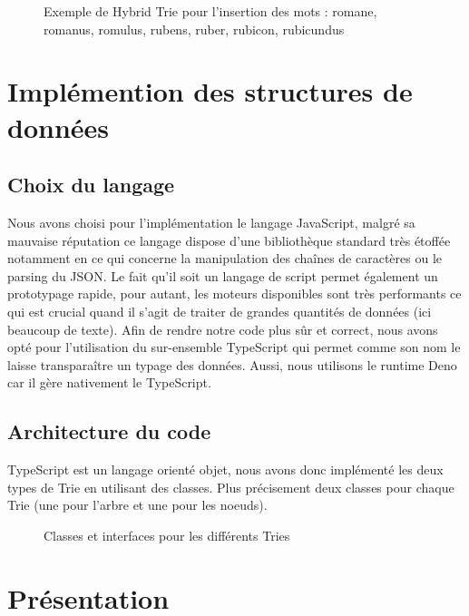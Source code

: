 \documentclass[11pt]{rapport-algav}
\begin{document}
\begin{figure}[ht!]
			\centering
			\caption{Exemple de Hybrid Trie pour l'insertion des mots : romane, romanus, romulus, rubens, ruber, rubicon, rubicundus}
			\label{fig:Hybrid_trie}
\end{figure}

\newpage

\chapter{Implémention des structures de données}

\section{Choix du langage}

Nous avons choisi pour l'implémentation le langage JavaScript, malgré sa mauvaise réputation ce langage dispose d'une bibliothèque standard très étoffée notamment en ce qui concerne la manipulation des chaînes de caractères ou le parsing du JSON. Le fait qu'il soit un langage de script permet également un prototypage rapide, pour autant, les moteurs disponibles sont très performants ce qui est crucial quand il s'agit de traiter de grandes quantités de données (ici beaucoup de texte). Afin de rendre notre code plus sûr et correct, nous avons opté pour l'utilisation du sur-ensemble TypeScript qui permet comme son nom le laisse transparaître un typage des données. Aussi, nous utilisons le runtime Deno car il gère nativement le TypeScript.

\section{Architecture du code}
TypeScript est un langage orienté objet, nous avons donc implémenté les deux types de Trie en utilisant des classes.
Plus précisement deux classes pour chaque Trie (une pour l'arbre et une pour les noeuds).

\begin{figure}[ht!]
			\centering
			\caption{Classes et interfaces pour les différents Tries}
			\label{fig:Classes}
\end{figure}

\newpage

\chapter{Présentation}
\end{document}
